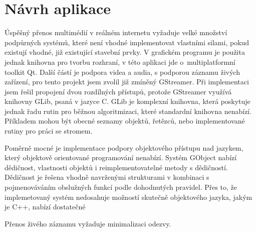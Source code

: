 
\chapter{Návrh aplikace}

Úspěšný přenos multimédií v reálném internetu vyžaduje velké množství 
podpůrných systémů, které není vhodné implementovat vlastními silami, pokud
existují vhodné, již existující stavební prvky. V grafickém programu 
je použita jednak knihovna pro tvorbu rozhraní, v této aplikaci jde 
o~multiplatformní toolkit Qt. Další částí je podpora videa a audia, s podporou
záznamu živých zařízení, pro tento projekt jsem zvolil již zmíněný GStreamer.
Při implementaci jsem řešil propojení dvou rozdílných přístupů, protože 
GStreamer využívá knihovny GLib, psaná v jazyce C. GLib je komplexní knihovna,
která poskytuje jednak řadu rutin pro běžnou algoritmizaci, které standardní 
knihovna nenabízí. Příkladem mohou být obecné seznamy objektů, řetězců, nebo
implementované rutiny pro práci se stromem. 

Poměrně mocné je implementace podpory objektového přístupu nad jazykem, který
objektově orientované programování nenabízí. Systém GObject nabízí dědičnost,
 vlastnosti objektů i reimplementovatelné metody s dědičností. Dědičnost je 
 řešena vhodně navrženými strukturami v kombinaci s pojmenováváním obslužných 
 funkcí podle dohodnutých pravidel. Přes to, že implemetovaný systém nedosahuje 
 možností skutečně objektového jazyka, jakým je C++, nabízí dostatečné 

Přenos živého záznamu vyžaduje minimalizaci odezvy. 

